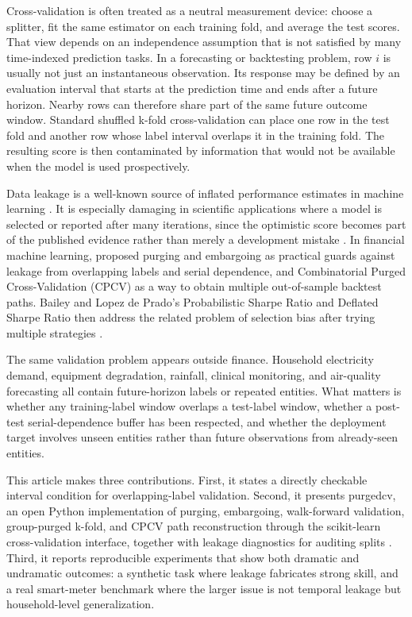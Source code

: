 \documentclass[11pt]{article}
\newcommand{\pcv}{\textsf{purgedcv}}
\newcommand{\pkg}[1]{\textsf{#1}}
\begin{document}
Cross-validation is often treated as a neutral measurement device: choose a
splitter, fit the same estimator on each training fold, and average the test
scores. That view depends on an independence assumption that is not satisfied by
many time-indexed prediction tasks. In a forecasting or backtesting problem, row
$i$ is usually not just an instantaneous observation. Its response may be
defined by an evaluation interval that starts at the prediction time and ends
after a future horizon. Nearby rows can therefore share part of the same future
outcome window. Standard shuffled k-fold cross-validation can place one row in
the test fold and another row whose label interval overlaps it in the training
fold. The resulting score is then contaminated by information that would not be
available when the model is used prospectively.

Data leakage is a well-known source of inflated performance estimates in
machine learning \citep{kaufman2012}. It is especially damaging in scientific
applications where a model is selected or reported after many iterations, since
the optimistic score becomes part of the published evidence rather than merely a
development mistake \citep{mcdermott2021}. In financial machine learning,
\citet{lopezdeprado2018afml} proposed purging and embargoing as practical
guards against leakage from overlapping labels and serial dependence, and
Combinatorial Purged Cross-Validation (CPCV) as a way to obtain multiple
out-of-sample backtest paths. Bailey and Lopez de Prado's Probabilistic Sharpe
Ratio and Deflated Sharpe Ratio then address the related problem of selection
bias after trying multiple strategies \citep{bailey2012psr,bailey2014dsr}.

The same validation problem appears outside finance. Household electricity
demand, equipment degradation, rainfall, clinical monitoring, and air-quality
forecasting all contain future-horizon labels or repeated entities. What matters
is whether any training-label window overlaps a test-label window, whether a
post-test serial-dependence buffer has been respected, and whether the
deployment target involves unseen entities rather than future observations from
already-seen entities.

This article makes three contributions. First, it states a directly checkable
interval condition for overlapping-label validation. Second, it presents \pcv,
an open Python implementation of purging, embargoing, walk-forward validation,
group-purged k-fold, and CPCV path reconstruction through the
\pkg{scikit-learn} cross-validation interface, together with leakage
diagnostics for auditing splits \citep{pedregosa2011sklearn,purgedcv2026}.
Third, it reports reproducible experiments that show both dramatic and
undramatic outcomes: a synthetic task where leakage fabricates strong skill, and
a real smart-meter benchmark where the larger issue is not temporal leakage but
household-level generalization.
\end{document}
